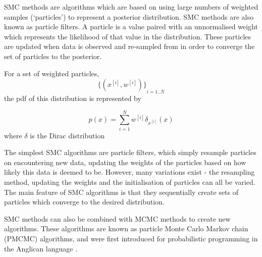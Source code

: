 SMC methods are algorithms which are based on using large numbers of weighted samples (`particles') to represent a posterior distribution. SMC methods are also known as particle filters. A particle is a value paired with an unnormalised weight which represents the likelihood of that value in the distribution. These particles are updated when data is observed and re-sampled from in order to converge the set of particles to the posterior.
	
For a set of weighted particles, 
$${\{(x^{[i]}, w^{[i]})\}}_{i=1..N}$$
the pdf of this distribution is represented by

\[
	p(x) = \sum_{i=1}^{N}w^{[i]}\delta_{x^{[i]}}(x)
\]
where $\delta$ is the Dirac distribution
	
The simplest SMC algorithms are particle filters\cite{particlefilter}, which simply resample particles on encountering new data, updating the weights of the particles based on how likely this data is deemed to be. However, many variations exist - the resampling method, updating the weights and the initialisation of particles can all be varied. The main feature of SMC algorithms is that they sequentially create sets of particles which converge to the desired distribution.

SMC methods can also be combined with MCMC methods to create new algorithms. These algorithms are known as particle Monte Carlo Markov chain (PMCMC) algorithms, and were first introduced for probabilistic programming in the Anglican language \cite{anglican-smc}.